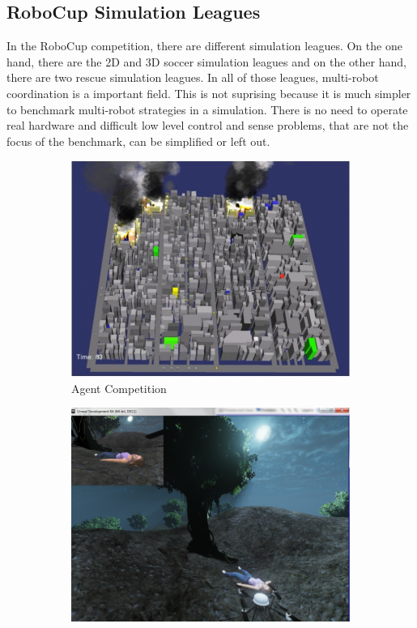 \subsection{RoboCup Simulation Leagues}
In the RoboCup competition, there are different simulation leagues. On the one hand, there are the 2D and 3D soccer simulation leagues and on the other hand, there are two rescue simulation leagues. In all of those leagues, multi-robot coordination is a important field. This is not suprising because it is much simpler to benchmark multi-robot strategies in a simulation. There is no need to operate real hardware and difficult low level control and sense problems, that are not the focus of the benchmark, can be simplified or left out.\\
\begin{figure}
  \centering
  \begin{subfigure}[b]{0.48\textwidth}
    \includegraphics[width=\textwidth]{pics/rescue3d}
    \caption{Agent Competition~\cite{rescue3d}}
    \label{fig:rescue_agent_competition}
  \end{subfigure}
  \begin{subfigure}[b]{0.48\textwidth}
    \includegraphics[width=\textwidth]{pics/rescue_vrc}

\end{subfigure}
\end{figure}
